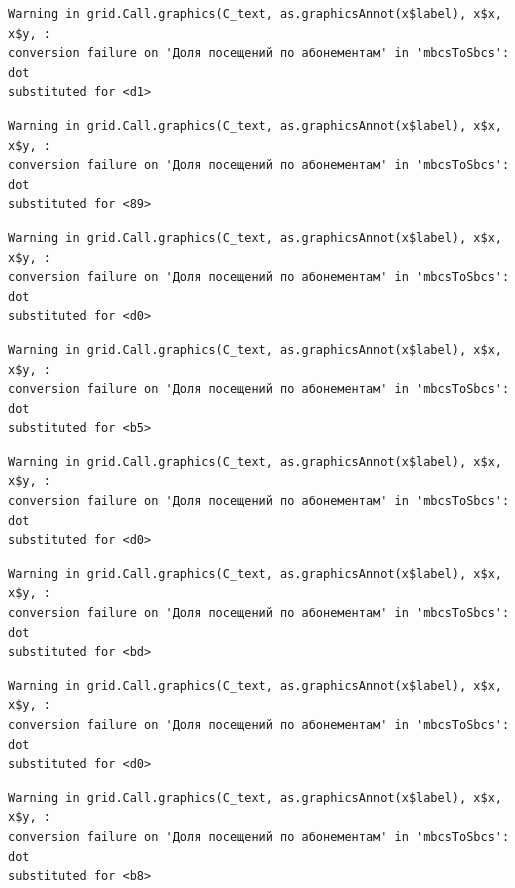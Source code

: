 \documentclass[
  letterpaper,
  DIV=11,
  numbers=noendperiod]{scrartcl}
\begin{document}
\begin{verbatim}
Warning in grid.Call.graphics(C_text, as.graphicsAnnot(x$label), x$x, x$y, :
conversion failure on 'Доля посещений по абонементам' in 'mbcsToSbcs': dot
substituted for <d1>
\end{verbatim}

\begin{verbatim}
Warning in grid.Call.graphics(C_text, as.graphicsAnnot(x$label), x$x, x$y, :
conversion failure on 'Доля посещений по абонементам' in 'mbcsToSbcs': dot
substituted for <89>
\end{verbatim}

\begin{verbatim}
Warning in grid.Call.graphics(C_text, as.graphicsAnnot(x$label), x$x, x$y, :
conversion failure on 'Доля посещений по абонементам' in 'mbcsToSbcs': dot
substituted for <d0>
\end{verbatim}

\begin{verbatim}
Warning in grid.Call.graphics(C_text, as.graphicsAnnot(x$label), x$x, x$y, :
conversion failure on 'Доля посещений по абонементам' in 'mbcsToSbcs': dot
substituted for <b5>
\end{verbatim}

\begin{verbatim}
Warning in grid.Call.graphics(C_text, as.graphicsAnnot(x$label), x$x, x$y, :
conversion failure on 'Доля посещений по абонементам' in 'mbcsToSbcs': dot
substituted for <d0>
\end{verbatim}

\begin{verbatim}
Warning in grid.Call.graphics(C_text, as.graphicsAnnot(x$label), x$x, x$y, :
conversion failure on 'Доля посещений по абонементам' in 'mbcsToSbcs': dot
substituted for <bd>
\end{verbatim}

\begin{verbatim}
Warning in grid.Call.graphics(C_text, as.graphicsAnnot(x$label), x$x, x$y, :
conversion failure on 'Доля посещений по абонементам' in 'mbcsToSbcs': dot
substituted for <d0>
\end{verbatim}

\begin{verbatim}
Warning in grid.Call.graphics(C_text, as.graphicsAnnot(x$label), x$x, x$y, :
conversion failure on 'Доля посещений по абонементам' in 'mbcsToSbcs': dot
substituted for <b8>
\end{verbatim}
\end{document}
